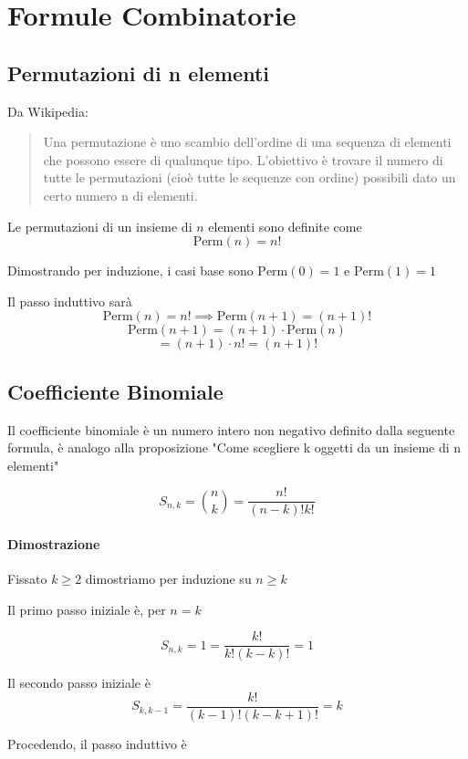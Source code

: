 \section{Formule Combinatorie}

\subsection{Permutazioni di n elementi}

Da Wikipedia: 

\begin{quote}
	Una permutazione è uno scambio dell'ordine di una sequenza di elementi che possono essere di qualunque tipo. L'obiettivo è trovare il numero di tutte le permutazioni (cioè tutte le sequenze con ordine) possibili dato un certo numero n di elementi.
\end{quote}

Le permutazioni di un insieme di $ n $ elementi sono definite come
\[ \text{Perm}(n) = n! \]

Dimostrando per induzione, i casi base sono $ \text{Perm}(0) = 1 $ e $ \text{Perm}(1) = 1 $

Il passo induttivo sarà 
\[ \text{Perm}(n) = n! \implies \text{Perm}(n+1) = (n+1)! \]
\[ \text{Perm}(n+1) = (n+1) \cdot \text{Perm}(n) \]
\[ = (n+1) \cdot n! = (n+1)! \]
\enddim

\subsection{Coefficiente Binomiale}
Il coefficiente binomiale è un numero intero non negativo definito dalla seguente formula, è analogo alla proposizione "Come scegliere k oggetti da un insieme di n elementi"

\[ S_{n,k} = \binom{n}{k} = \dfrac{n!}{(n-k)!k!} \]

\paragraph{Dimostrazione}

Fissato $ k \geq 2 $ dimostriamo per induzione su $ n \geq k $

Il primo passo iniziale è, per $ n = k $

\[ S_{n,k} = 1 = \dfrac{k!}{k!(k-k)!} = 1\]

Il secondo passo iniziale è
\[ S_{k,k-1} = \dfrac{k!}{(k-1)!(k-k+1)!} = k\]

Procedendo, il passo induttivo è

